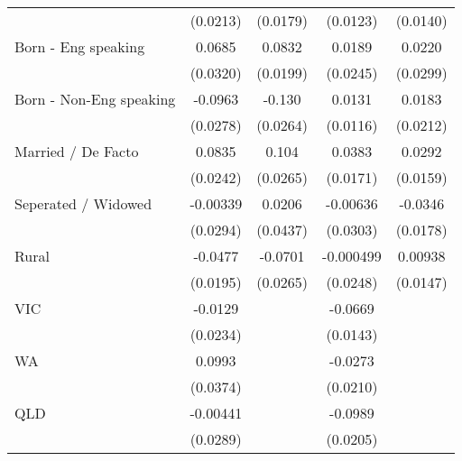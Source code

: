 {\begin{tabular}{l*{4}{c}}
                    &    (0.0213)         &    (0.0179)         &    (0.0123)         &    (0.0140)         \\
[1em]
Born - Eng speaking &      0.0685\sym{*}  &      0.0832\sym{***}&      0.0189         &      0.0220         \\
                    &    (0.0320)         &    (0.0199)         &    (0.0245)         &    (0.0299)         \\
[1em]
Born - Non-Eng speaking&     -0.0963\sym{***}&      -0.130\sym{***}&      0.0131         &      0.0183         \\
                    &    (0.0278)         &    (0.0264)         &    (0.0116)         &    (0.0212)         \\
[1em]
Married / De Facto  &      0.0835\sym{***}&       0.104\sym{***}&      0.0383\sym{*}  &      0.0292         \\
                    &    (0.0242)         &    (0.0265)         &    (0.0171)         &    (0.0159)         \\
[1em]
Seperated / Widowed &    -0.00339         &      0.0206         &    -0.00636         &     -0.0346         \\
                    &    (0.0294)         &    (0.0437)         &    (0.0303)         &    (0.0178)         \\
[1em]
Rural               &     -0.0477\sym{*}  &     -0.0701\sym{**} &   -0.000499         &     0.00938         \\
                    &    (0.0195)         &    (0.0265)         &    (0.0248)         &    (0.0147)         \\
[1em]
VIC                 &     -0.0129         &                     &     -0.0669\sym{***}&                     \\
                    &    (0.0234)         &                     &    (0.0143)         &                     \\
[1em]
WA                  &      0.0993\sym{**} &                     &     -0.0273         &                     \\
                    &    (0.0374)         &                     &    (0.0210)         &                     \\
[1em]
QLD                 &    -0.00441         &                     &     -0.0989\sym{***}&                     \\
                    &    (0.0289)         &                     &    (0.0205)         &                     \\

\end{tabular}}
